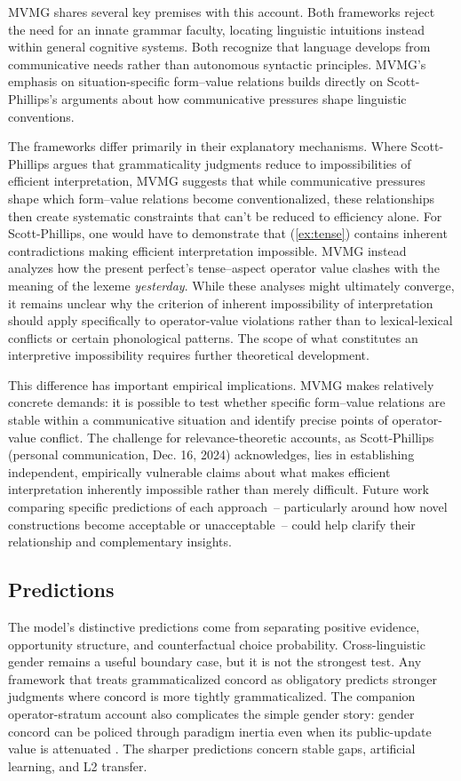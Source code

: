\documentclass[12pt,letterpaper]{article}
\newcommand{\mention}[1]{\textit{#1}}
\begin{document}
MVMG shares several key premises with this account. Both frameworks reject the need for an innate grammar faculty, locating linguistic intuitions instead within general cognitive systems. Both recognize that language develops from communicative needs rather than autonomous syntactic principles. MVMG's emphasis on situation-specific form--value relations builds directly on Scott-Phillips's arguments about how communicative pressures shape linguistic conventions.

The frameworks differ primarily in their explanatory mechanisms. Where Scott-Phillips argues that grammaticality judgments reduce to impossibilities of efficient interpretation, MVMG suggests that while communicative pressures shape which form--value relations become conventionalized, these relationships then create systematic constraints that can't be reduced to efficiency alone. For Scott-Phillips, one would have to demonstrate that (\ref{ex:tense}) contains inherent contradictions making efficient interpretation impossible. MVMG instead analyzes how the present perfect's tense--aspect operator value clashes with the meaning of the lexeme \mention{yesterday}. While these analyses might ultimately converge, it remains unclear why the criterion of inherent impossibility of interpretation should apply specifically to operator-value violations rather than to lexical-lexical conflicts or certain phonological patterns. The scope of what constitutes an interpretive impossibility requires further theoretical development.

This difference has important empirical implications. MVMG makes relatively concrete demands: it is possible to test whether specific form--value relations are stable within a communicative situation and identify precise points of operator-value conflict. The challenge for relevance-theoretic accounts, as Scott-Phillips (personal communication, Dec. 16, 2024) acknowledges, lies in establishing independent, empirically vulnerable claims about what makes efficient interpretation inherently impossible rather than merely difficult. Future work comparing specific predictions of each approach~-- particularly around how novel constructions become acceptable or unacceptable~-- could help clarify their relationship and complementary insights.

\subsection{Predictions}

The model's distinctive predictions come from separating positive evidence,
opportunity structure, and counterfactual choice probability. Cross-linguistic
gender remains a useful boundary case, but it is not the strongest test. Any
framework that treats grammaticalized concord as obligatory predicts stronger
judgments where concord is more tightly grammaticalized. The companion
operator-stratum account also complicates the simple gender story: gender
concord can be policed through paradigm inertia even when its public-update
value is attenuated \autocite{reynolds2026operators}. The sharper predictions
concern stable gaps, artificial learning, and L2 transfer.
\end{document}
